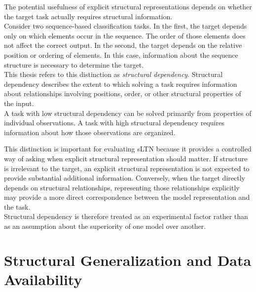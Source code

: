 \noindent
The potential usefulness of explicit structural representations depends on whether the target task actually requires structural information.
\\
Consider two sequence-based classification tasks. In the first, the target depends only on which elements occur in the sequence. The order of those elements does not affect the correct output. In the second, the target depends on the relative position or ordering of elements. In this case, information about the sequence structure is necessary to determine the target.
\\
This thesis refers to this distinction as \textit{structural dependency}. Structural dependency describes the extent to which solving a task requires information about relationships involving positions, order, or other structural properties of the input.
\\
A task with low structural dependency can be solved primarily from properties of individual observations. A task with high structural dependency requires information about how those observations are organized.

\noindent
This distinction is important for evaluating sLTN because it provides a controlled way of asking when explicit structural representation should matter. If structure is irrelevant to the target, an explicit structural representation is not expected to provide substantial additional information. Conversely, when the target directly depends on structural relationships, representing those relationships explicitly may provide a more direct correspondence between the model representation and the task.
\\
Structural dependency is therefore treated as an experimental factor rather than as an assumption about the superiority of one model over another.

\section{Structural Generalization and Data Availability}

